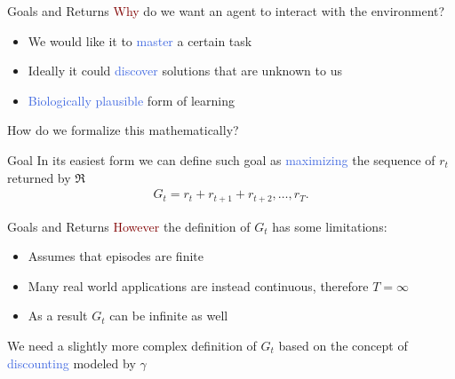 \documentclass{beamer}
\begin{document}
\begin{frame}{Goals and Returns}
	\textcolor{Maroon}{Why} do we want an agent to interact with the environment?
	\begin{itemize}
		\item We would like it to \textcolor{RoyalBlue}{master} a certain task
		\item Ideally it could \textcolor{RoyalBlue}{discover} solutions that are unknown to us
		\item \textcolor{RoyalBlue}{Biologically plausible} form of learning
	\end{itemize}

	How do we formalize this mathematically?

	\begin{block}{Goal}
		In its easiest form we can define such goal as \textcolor{RoyalBlue}{maximizing} the sequence of $r_t$ returned by $\Re$
		\begin{align*}
			G_t = r_t + r_{t+1} + r_{t+2}, \ldots, r_T.
		\end{align*}
	\end{block}

\end{frame}

\begin{frame}{Goals and Returns}
	\textcolor{Maroon}{However} the definition of $G_t$ has some limitations:
	\begin{itemize}
		\item Assumes that episodes are finite 
		\item Many real world applications are instead continuous, therefore $T=\infty$
		\item As a result $G_t$ can be infinite as well
	\end{itemize}

	\bigskip

	We need a slightly more complex definition of $G_t$ based on the concept of \textcolor{RoyalBlue}{discounting} modeled by $\gamma$  

\end{frame}
\end{document}
